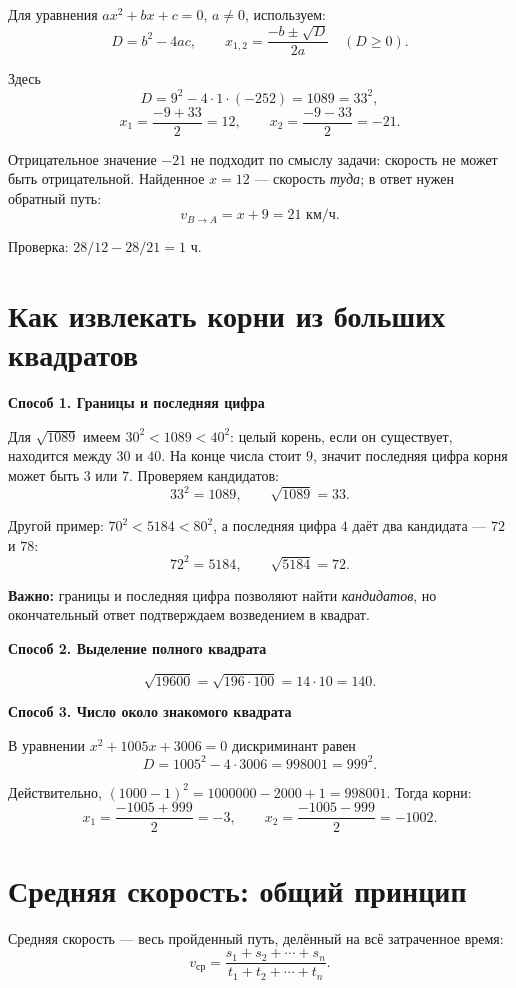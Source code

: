 \documentclass[a4paper,12pt]{article}
\newcommand{\method}[1]{\par\medskip\textcolor{darkaccent}{\textbf{#1}}\par\smallskip}
\newcommand{\important}[1]{\textcolor{darkaccent}{#1}}
\begin{document}
Для уравнения $ax^2+bx+c=0$, $a\ne0$, используем:
\[
D=b^2-4ac,\qquad x_{1,2}=\frac{-b\pm\sqrt D}{2a}\quad(D\ge0).
\]

Здесь
\[
D=9^2-4\cdot1\cdot(-252)=1089=33^2,
\]
\[
x_1=\frac{-9+33}{2}=12,\qquad
x_2=\frac{-9-33}{2}=-21.
\]

Отрицательное значение $-21$ не подходит по смыслу задачи: скорость не может быть отрицательной. Найденное $x=12$ --- скорость \emph{туда}; в ответ нужен обратный путь:
\[
\boxed{v_{B\to A}=x+9=21\text{ км/ч}.}
\]

Проверка: $28/12-28/21=1$ ч.

\section{Как извлекать корни из больших квадратов}

\method{Способ 1. Границы и последняя цифра}

Для $\sqrt{1089}$ имеем $30^2<1089<40^2$: целый корень, если он существует, находится между $30$ и $40$. На конце числа стоит $9$, значит последняя цифра корня может быть $3$ или $7$. Проверяем кандидатов:
\[
33^2=1089,\qquad\boxed{\sqrt{1089}=33}.
\]

Другой пример: $70^2<5184<80^2$, а последняя цифра $4$ даёт два кандидата --- $72$ и $78$:
\[
72^2=5184,\qquad\boxed{\sqrt{5184}=72}.
\]

\textbf{Важно:} границы и последняя цифра позволяют найти \emph{кандидатов}, но окончательный ответ подтверждаем возведением в квадрат.

\method{Способ 2. Выделение полного квадрата}
\[
\sqrt{19600}=\sqrt{196\cdot100}=14\cdot10=\boxed{140}.
\]

\method{Способ 3. Число около знакомого квадрата}

В уравнении $x^2+1005x+3006=0$ дискриминант равен
\[
D=1005^2-4\cdot3006=998001=999^2.
\]

Действительно, $(1000-1)^2=1000000-2000+1=998001$. Тогда корни:
\[
 x_1=\frac{-1005+999}{2}=-3,\qquad
 x_2=\frac{-1005-999}{2}=-1002.
\]

\section{Средняя скорость: общий принцип}

Средняя скорость --- \important{весь пройденный путь}, делённый на \important{всё затраченное время}:
\[
\boxed{v_{\text{ср}}=\frac{s_1+s_2+\cdots+s_n}{t_1+t_2+\cdots+t_n}}.
\]
\end{document}
